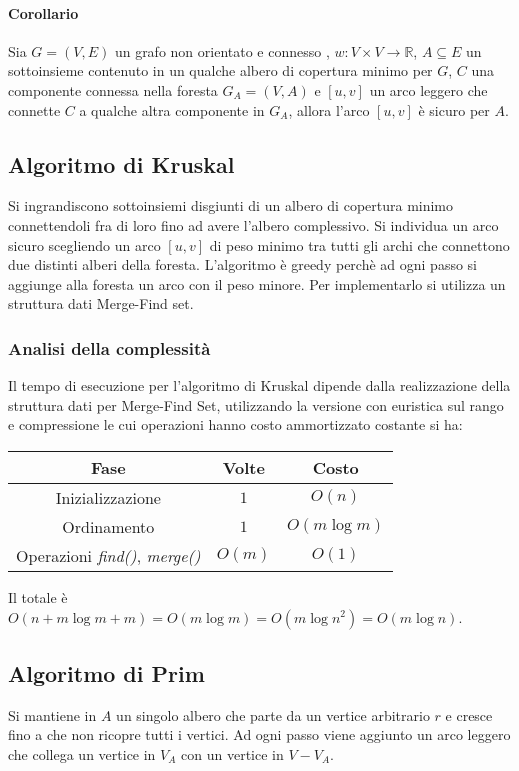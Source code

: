 	\paragraph{Corollario}
	Sia $G=(V, E)$ un grafo non orientato e connesso , $w:V\times V\rightarrow\mathbb{R}$, $A\subseteq E$ un sottoinsieme contenuto in un qualche albero di copertura minimo per $G$, $C$
	una componente connessa nella foresta $G_A=(V, A)$ e $[u, v]$ un arco leggero che connette $C$ a qualche altra componente in $G_A$, allora l'arco $[u, v]$ \`e sicuro per $A$. 
	\subsection{Algoritmo di Kruskal}
	Si ingrandiscono sottoinsiemi disgiunti di un albero di copertura minimo connettendoli fra di loro fino ad avere l'albero complessivo. Si individua un arco sicuro scegliendo un arco
	$[u, v]$ di peso minimo tra tutti gli archi che connettono due distinti alberi della foresta. L'algoritmo \`e greedy perch\`e ad ogni passo si aggiunge alla foresta un arco con il peso
	minore. Per implementarlo si utilizza un struttura dati Merge-Find set.\\
	
	\subsubsection{Analisi della complessit\`a}
	Il tempo di esecuzione per l'algoritmo di Kruskal dipende dalla realizzazione della struttura dati per Merge-Find Set, utilizzando la versione con euristica sul rango e compressione le
	cui operazioni hanno costo ammortizzato costante si ha:
	\begin{center}
	\begin{tabular}{|c|c|c|}
		\hline
		\textbf{Fase} & \textbf{Volte} & \textbf{Costo} \\
		\hline
		Inizializzazione & $1$ & $O(n)$ \\
		\hline
		Ordinamento & $1$ & $O(m\log m)$ \\
		\hline
		Operazioni \emph{find()}, \emph{merge()} & $O(m)$ & $O(1)$\\
		\hline
	\end{tabular}
	\end{center}
	Il totale \`e $O(n+m\log m + m) = O(m\log m) = O(m\log n^2) = O(m\log n)$.
	\subsection{Algoritmo di Prim}
	Si mantiene in $A$ un singolo albero che parte da un vertice arbitrario $r$ e cresce fino a che non ricopre tutti i vertici. Ad ogni passo viene aggiunto un arco leggero che collega
	un vertice in $V_A$ con un vertice in $V-V_A$.
